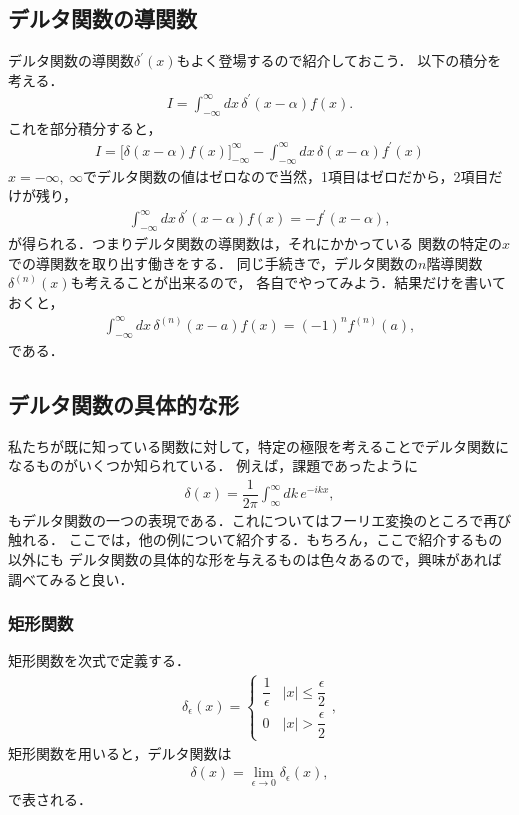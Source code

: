 \subsection{デルタ関数の導関数}
%
デルタ関数の導関数$\delta^{\prime}(x)$もよく登場するので紹介しておこう．
以下の積分を考える．
\begin{align}
  I = \int_{-\infty}^{\infty}dx\,\delta^{\prime} \left(x-\alpha\right) f\left(x\right).
\end{align}
これを部分積分すると，
\begin{align}
  I = \biggl[\delta\left(x-\alpha\right)f\left(x\right)\biggr]_{-\infty}^{\infty} - \int_{-\infty}^{\infty}dx\, \delta(x-\alpha) f^{\prime}\left(x\right) 
\end{align}
%
$x=-\infty,~\infty$でデルタ関数の値はゼロなので当然，1項目はゼロだから，2項目だけが残り，
\begin{align}
  \int_{-\infty}^{\infty}dx\, \delta^{\prime}\left(x-\alpha\right)f\left(x\right) = - f^{\prime}\left(x-\alpha\right), 
\end{align}
が得られる．つまりデルタ関数の導関数は，それにかかっている
関数の特定の$x$での導関数を取り出す働きをする．
同じ手続きで，デルタ関数の$n$階導関数$\delta^{(n)}\left(x\right)$も考えることが出来るので，
各自でやってみよう．結果だけを書いておくと，
\begin{align}
  \int_{-\infty}^{\infty}dx\, \delta^{\left(n\right)}\left(x-a\right) f\left(x\right) = \left(-1\right)^{n}f^{\left(n\right)}\left(a\right), 
\end{align}
である．
%
\subsection{デルタ関数の具体的な形}
%
私たちが既に知っている関数に対して，特定の極限を考えることでデルタ関数になるものがいくつか知られている．
例えば，課題であったように
\begin{align}
 \delta\left(x\right) = \dfrac{1}{2\pi}\int_{\infty}^{\infty}dk\,e^{-ikx}, 
\end{align}
もデルタ関数の一つの表現である．これについてはフーリエ変換のところで再び触れる．
ここでは，他の例について紹介する．もちろん，ここで紹介するもの以外にも
デルタ関数の具体的な形を与えるものは色々あるので，興味があれば調べてみると良い．
%
\subsubsection{矩形関数}
%
矩形関数を次式で定義する．
\begin{align}
 \delta_{\epsilon}\left(x\right) =
 \begin{cases}
   \dfrac{1}{\epsilon} & \left|x\right|\leq \dfrac{\epsilon}{2} \\[.2cm]
   0                   & \left|x\right|>    \dfrac{\epsilon}{2} 
 \end{cases},
\end{align}
%
矩形関数を用いると，デルタ関数は
\begin{align}
  \delta\left(x\right) = \lim_{\epsilon \to 0}\delta_{\epsilon}\left(x\right), 
\end{align}
で表される．
%
